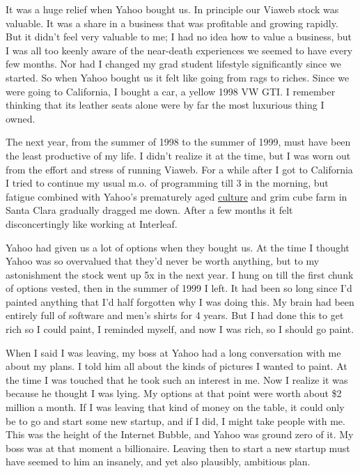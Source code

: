 \documentclass[12pt]{book}
\begin{document}
It was a huge relief when Yahoo bought us. In principle our Viaweb stock
was valuable. It was a share in a business that was profitable and
growing rapidly. But it didn't feel very valuable to me; I had no idea
how to value a business, but I was all too keenly aware of the
near-death experiences we seemed to have every few months. Nor had I
changed my grad student lifestyle significantly since we started. So
when Yahoo bought us it felt like going from rags to riches. Since we
were going to California, I bought a car, a yellow 1998 VW GTI. I
remember thinking that its leather seats alone were by far the most
luxurious thing I owned.

The next year, from the summer of 1998 to the summer of 1999, must have
been the least productive of my life. I didn't realize it at the time,
but I was worn out from the effort and stress of running Viaweb. For a
while after I got to California I tried to continue my usual m.o. of
programming till 3 in the morning, but fatigue combined with Yahoo's
prematurely aged \href{yahoo.html}{culture} and grim cube farm in Santa
Clara gradually dragged me down. After a few months it felt
disconcertingly like working at Interleaf.

Yahoo had given us a lot of options when they bought us. At the time I
thought Yahoo was so overvalued that they'd never be worth anything, but
to my astonishment the stock went up 5x in the next year. I hung on till
the first chunk of options vested, then in the summer of 1999 I left. It
had been so long since I'd painted anything that I'd half forgotten why
I was doing this. My brain had been entirely full of software and men's
shirts for 4 years. But I had done this to get rich so I could paint, I
reminded myself, and now I was rich, so I should go paint.

When I said I was leaving, my boss at Yahoo had a long conversation with
me about my plans. I told him all about the kinds of pictures I wanted
to paint. At the time I was touched that he took such an interest in me.
Now I realize it was because he thought I was lying. My options at that
point were worth about \$2 million a month. If I was leaving that kind
of money on the table, it could only be to go and start some new
startup, and if I did, I might take people with me. This was the height
of the Internet Bubble, and Yahoo was ground zero of it. My boss was at
that moment a billionaire. Leaving then to start a new startup must have
seemed to him an insanely, and yet also plausibly, ambitious plan.
\end{document}
